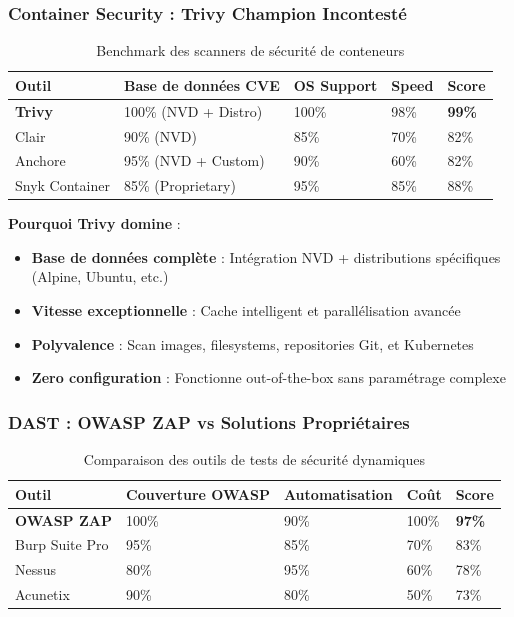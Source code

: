 \documentclass[12pt,a4paper]{report}
\begin{document}
\subsubsection{Container Security : Trivy Champion Incontesté}

\begin{table}[H]
    \centering
    \begin{tabularx}{\textwidth}{|X|X|X|X|X|}
        \hline
        \textbf{Outil} & \textbf{Base de données CVE} & \textbf{OS Support} & \textbf{Speed} & \textbf{Score} \\
        \hline
        \textbf{Trivy} & 100\% (NVD + Distro) & 100\% & 98\% & \textbf{99\%} \\
        \hline
        Clair & 90\% (NVD) & 85\% & 70\% & 82\% \\
        \hline
        Anchore & 95\% (NVD + Custom) & 90\% & 60\% & 82\% \\
        \hline
        Snyk Container & 85\% (Proprietary) & 95\% & 85\% & 88\% \\
        \hline
    \end{tabularx}
    \caption{Benchmark des scanners de sécurité de conteneurs}
\end{table}

\textbf{Pourquoi Trivy domine} :
\begin{itemize}
    \item \textbf{Base de données complète} : Intégration NVD + distributions spécifiques (Alpine, Ubuntu, etc.)
    \item \textbf{Vitesse exceptionnelle} : Cache intelligent et parallélisation avancée
    \item \textbf{Polyvalence} : Scan images, filesystems, repositories Git, et Kubernetes
    \item \textbf{Zero configuration} : Fonctionne out-of-the-box sans paramétrage complexe
\end{itemize}

\subsubsection{DAST : OWASP ZAP vs Solutions Propriétaires}

\begin{table}[H]
    \centering
    \begin{tabularx}{\textwidth}{|X|X|X|X|X|}
        \hline
        \textbf{Outil} & \textbf{Couverture OWASP} & \textbf{Automatisation} & \textbf{Coût} & \textbf{Score} \\
        \hline
        \textbf{OWASP ZAP} & 100\% & 90\% & 100\% & \textbf{97\%} \\
        \hline
        Burp Suite Pro & 95\% & 85\% & 70\% & 83\% \\
        \hline
        Nessus & 80\% & 95\% & 60\% & 78\% \\
        \hline
        Acunetix & 90\% & 80\% & 50\% & 73\% \\
        \hline
    \end{tabularx}
    \caption{Comparaison des outils de tests de sécurité dynamiques}
\end{table}
\end{document}
